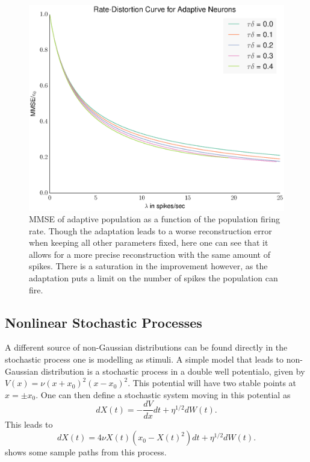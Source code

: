 \begin{figure}
\label{fig:adaptive_rate_distortion}
\includegraphics[width=\columnwidth]{figures/figure_5_9.eps}
\caption[MSE for adaptive neurons as a function of population firing rate.]{MMSE of adaptive population as a function of the population firing rate. Though the adaptation leads to a worse reconstruction error when keeping all other parameters fixed,
here one can see that it allows for a more precise reconstruction with the same amount of spikes. There is a saturation in the improvement however, as the adaptation puts a limit
on the number of spikes the population can fire.}
\end{figure}

\subsection{Nonlinear Stochastic Processes}

A different source of non-Gaussian distributions can be found directly in the stochastic process one is modelling as stimuli. A simple model that leads to non-Gaussian
distribution is a stochastic process in a double well potentialo, given by $V(x) = \nu(x+x_0)^2(x-x_0)^2$. This potential will have two
stable points at $x=\pm x_0$. One can then define a stochastic 
system moving in this potential as
\[
dX(t)  = -\frac{dV}{dx}dt + \eta^{1/2} dW(t).
\]
This leads to
\[
dX(t) = 4\nu X(t)\left(x_0 - X(t)^2\right) dt + \eta^{1/2} dW(t).
\]
 shows some sample paths from this process.

